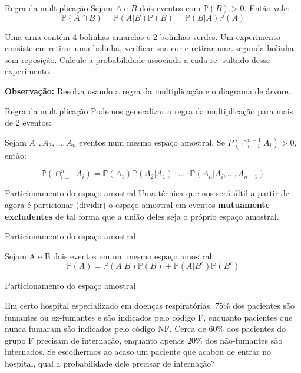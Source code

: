 \begin{frame}{Regra da multiplicação}
 Sejam $A$ e $B$ dois eventos com $\mathds{P}(B)>0$. Então vale:
 $$\mathds{P}(A \cap B) = \mathds{P}(A | B) \mathds{P}(B) = \mathds{P}(B | A) \mathds{P}(A)$$
\end{frame}

\begin{frame}
\begin{exemplo}
    Uma urna contém 4 bolinhas amarelas e 2 bolinhas verdes. Um
experimento consiste em retirar uma bolinha, verificar sua cor e retirar uma
segunda bolinha sem reposição. Calcule a probabilidade associada a cada re-
sultado desse experimento.
\end{exemplo}

\textbf{Observação:} Resolva usando a regra da multiplicação e o diagrama de árvore. 
\end{frame}

\begin{frame}{Regra da multiplicação}
    Podemos generalizar a regra da multiplicação para mais de 2 eventos:

    \pause

Sejam $A_1, A_2, \dots , A_n$ eventos num mesmo espaço amostral. Se
    $P(\cap_{i=1}^{n-1}A_i) > 0$, então:

    $$\mathds{P}(\cap_{i=1}^n A_i) = \mathds{P}(A_1)\mathds{P}(A_2|A_1) \cdot \dots \cdot \mathds{P}(A_n|A_i, \dots, A_{n-1} )$$

\end{frame}
\begin{frame}{Particionamento do espaço amostral}
Uma técnica que nos será últil a partir de agora é particionar (dividir) o espaço amostral em eventos \textbf{mutuamente excludentes} de tal forma que a união deles
seja o próprio espaço amostral. 
\end{frame}

\begin{frame}{Particionamento do espaço amostral}
    \begin{definicao}
        Sejam A e B dois eventos em um mesmo espaço amostral:
        $$\mathds{P}(A) = \mathds{P}(A|B)\mathds{P}(B) + \mathds{P}(A|B^c)\mathds{P}(B^c)$$
    \end{definicao}
\end{frame}

\begin{frame}{Particionamento do espaço amostral}
    \begin{exemplo}[1]
        Em certo hospital especializado em doenças respiratórias, 75\% dos pacientes são fumantes ou ex-fumantes e são indicados pelo código F, enquanto pacientes que nunca fumaram são indicados pelo código NF. Cerca de 60\% dos pacientes do grupo F precisam de internação, enquanto apenas 20\% dos não-fumantes  são internados. Se escolhermos ao acaso um paciente que acabou de entrar no hospital, qual a probabilidade dele precisar de internação?
    \end{exemplo}
\end{frame}

